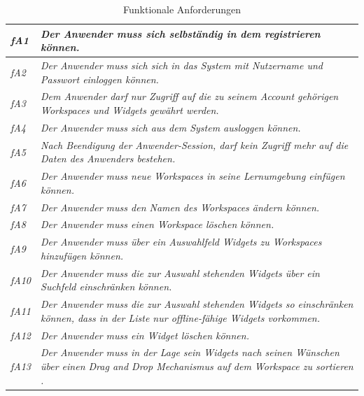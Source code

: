 \begin{table}[h]
\caption{Funktionale Anforderungen}
\begin{tabularx}{\textwidth}{ l | X }
\emph{fA1} & \emph{Der Anwender muss sich selbständig in dem registrieren können.} \\ \hline
\emph{fA2} & \emph{Der Anwender muss sich sich in das System mit Nutzername und Passwort einloggen können.} \\ \hline
\emph{fA3} & \emph{Dem Anwender darf nur Zugriff auf die zu seinem Account gehörigen Workspaces und Widgets gewährt werden.} \\ \hline
\emph{fA4} & \emph{Der Anwender muss sich aus dem System ausloggen können.} \\ \hline
\emph{fA5} & \emph{Nach Beendigung der Anwender-Session, darf kein Zugriff mehr auf die Daten des Anwenders bestehen.} \\ \hline
\emph{fA6} & \emph{Der Anwender muss neue Workspaces in seine Lernumgebung einfügen können.} \\ \hline
\emph{fA7} & \emph{Der Anwender muss den Namen des Workspaces ändern können.} \\ \hline
\emph{fA8} & \emph{Der Anwender muss einen Workspace löschen können.} \\ \hline
\emph{fA9} & \emph{Der Anwender muss über ein Auswahlfeld Widgets zu Workspaces hinzufügen können.} \\ \hline
\emph{fA10} & \emph{Der Anwender muss die zur Auswahl stehenden Widgets über ein Suchfeld einschränken können.} \\ \hline
\emph{fA11} & \emph{Der Anwender muss die zur Auswahl stehenden Widgets so einschränken können, dass in der Liste nur offline-fähige Widgets vorkommen.} \\ \hline
\emph{fA12} & \emph{Der Anwender muss ein Widget löschen können.} \\\hline
\emph{fA13} & \emph{Der Anwender muss in der Lage sein Widgets nach seinen Wünschen über einen Drag and Drop Mechanismus auf dem Workspace zu sortieren .} \\ \hline
\end{tabularx}
\label{table:funktionale_anforderungen}
\end{table}

